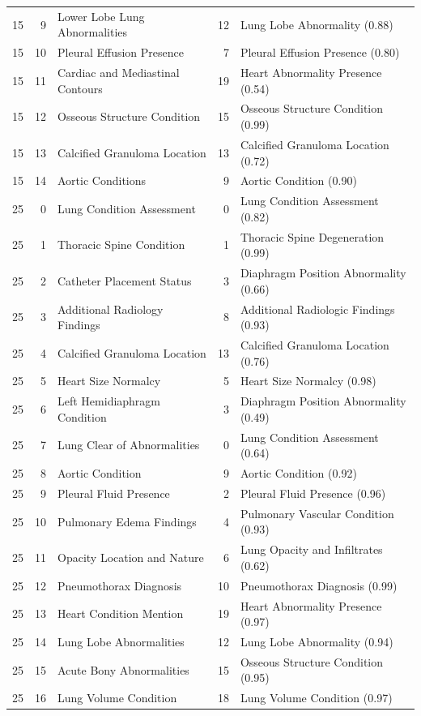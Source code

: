 \begin{table}[t]
\begin{tabular}{rrlrl}
15 & 9 & Lower Lobe Lung Abnormalities & 12 & Lung Lobe Abnormality (0.88) \\
15 & 10 & Pleural Effusion Presence & 7 & Pleural Effusion Presence (0.80) \\
15 & 11 & Cardiac and Mediastinal Contours & 19 & Heart Abnormality Presence (0.54) \\
15 & 12 & Osseous Structure Condition & 15 & Osseous Structure Condition (0.99) \\
15 & 13 & Calcified Granuloma Location & 13 & Calcified Granuloma Location (0.72) \\
15 & 14 & Aortic Conditions & 9 & Aortic Condition (0.90) \\
25 & 0 & Lung Condition Assessment & 0 & Lung Condition Assessment (0.82) \\
25 & 1 & Thoracic Spine Condition & 1 & Thoracic Spine Degeneration (0.99) \\
25 & 2 & Catheter Placement Status & 3 & Diaphragm Position Abnormality (0.66) \\
25 & 3 & Additional Radiology Findings & 8 & Additional Radiologic Findings (0.93) \\
25 & 4 & Calcified Granuloma Location & 13 & Calcified Granuloma Location (0.76) \\
25 & 5 & Heart Size Normalcy & 5 & Heart Size Normalcy (0.98) \\
25 & 6 & Left Hemidiaphragm Condition & 3 & Diaphragm Position Abnormality (0.49) \\
25 & 7 & Lung Clear of Abnormalities & 0 & Lung Condition Assessment (0.64) \\
25 & 8 & Aortic Condition & 9 & Aortic Condition (0.92) \\
25 & 9 & Pleural Fluid Presence & 2 & Pleural Fluid Presence (0.96) \\
25 & 10 & Pulmonary Edema Findings & 4 & Pulmonary Vascular Condition (0.93) \\
25 & 11 & Opacity Location and Nature & 6 & Lung Opacity and Infiltrates (0.62) \\
25 & 12 & Pneumothorax Diagnosis & 10 & Pneumothorax Diagnosis (0.99) \\
25 & 13 & Heart Condition Mention & 19 & Heart Abnormality Presence (0.97) \\
25 & 14 & Lung Lobe Abnormalities & 12 & Lung Lobe Abnormality (0.94) \\
25 & 15 & Acute Bony Abnormalities & 15 & Osseous Structure Condition (0.95) \\
25 & 16 & Lung Volume Condition & 18 & Lung Volume Condition (0.97) \\

\end{tabular}
\end{table}
